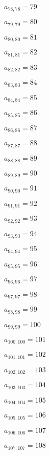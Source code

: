 \documentclass[a4paper,12pt]{article}
\begin{document}
$a _{ 78, 78 } = 79$

$a _{ 79, 79 } = 80$

$a _{ 80, 80 } = 81$

$a _{ 81, 81 } = 82$

$a _{ 82, 82 } = 83$

$a _{ 83, 83 } = 84$

$a _{ 84, 84 } = 85$

$a _{ 85, 85 } = 86$

$a _{ 86, 86 } = 87$

$a _{ 87, 87 } = 88$

$a _{ 88, 88 } = 89$

$a _{ 89, 89 } = 90$

$a _{ 90, 90 } = 91$

$a _{ 91, 91 } = 92$

$a _{ 92, 92 } = 93$

$a _{ 93, 93 } = 94$

$a _{ 94, 94 } = 95$

$a _{ 95, 95 } = 96$

$a _{ 96, 96 } = 97$

$a _{ 97, 97 } = 98$

$a _{ 98, 98 } = 99$

$a _{ 99, 99 } = 100$

$a _{ 100, 100 } = 101$

$a _{ 101, 101 } = 102$

$a _{ 102, 102 } = 103$

$a _{ 103, 103 } = 104$

$a _{ 104, 104 } = 105$

$a _{ 105, 105 } = 106$

$a _{ 106, 106 } = 107$

$a _{ 107, 107 } = 108$
\end{document}
